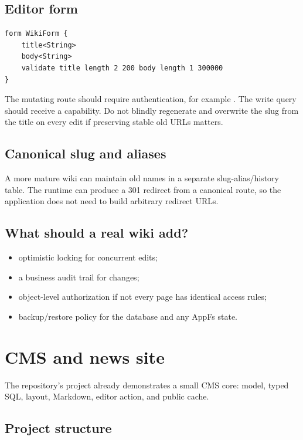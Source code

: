 \subsection*{Editor form}

\begin{lstlisting}[language=Velran]
form WikiForm {
    title<String>
    body<String>
    validate title length 2 200 body length 1 300000
}
\end{lstlisting}

The mutating route should require authentication, for example . The write query should receive a  capability. Do not blindly regenerate and overwrite the slug from the title on every edit if preserving stable old URLs matters.

\subsection*{Canonical slug and aliases}

A more mature wiki can maintain old names in a separate slug-alias/history table. The runtime can produce a 301 redirect from a canonical route, so the application does not need to build arbitrary redirect URLs.

\subsection*{What should a real wiki add?}

\begin{itemize}
  \item optimistic locking for concurrent edits;
  \item a business audit trail for changes;
  \item object-level authorization if not every page has identical access rules;
  \item backup/restore policy for the database and any AppFs state.
\end{itemize}

\section{CMS and news site}

The repository's  project already demonstrates a small CMS core: model, typed SQL, layout, Markdown, editor action, and public cache.

\subsection*{Project structure}

